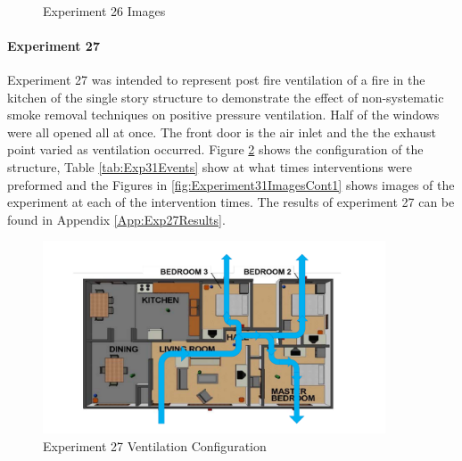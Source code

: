 \documentclass{article}
\begin{document}
\begin{figure}[H]
	\ContinuedFloat 
	\centering 
	 \ 
	\caption{Experiment 26 Images}
	\label{fig:Experiment30ImagesCont4} 
\end{figure}

\paragraph{Experiment 27} \mbox{}

Experiment 27 was intended to represent post fire ventilation of a fire in the kitchen of the single story structure to demonstrate the effect of non-systematic smoke removal techniques on positive pressure ventilation. Half of the windows were all opened all at once. The front door is the air inlet and the the exhaust point varied as ventilation occurred. Figure \ref{fig:Exp31VentConfig} shows the configuration of the structure, Table \ref{tab:Exp31Events} show at what times interventions were preformed and the Figures in \ref{fig:Experiment31ImagesCont1} shows images of the experiment at each of the intervention times. The results of experiment 27 can be found in Appendix \ref{App:Exp27Results}.

\begin{figure} [H]
	\centering
	\includegraphics[width = 4in]{0_Images/Tactical_Considerations/Systematic_Vs_Non-Systematic/Non_Systematic.pdf}
	\caption{Experiment 27 Ventilation Configuration}
	\label{fig:Exp31VentConfig}
\end{figure}
\end{document}
